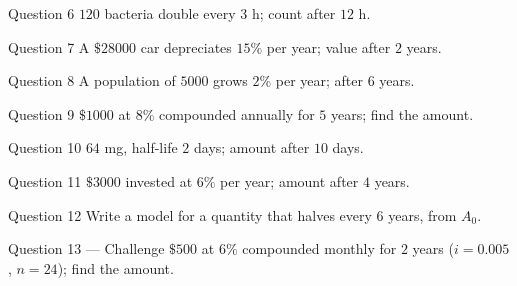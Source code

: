 \documentclass[11pt]{article}
\begin{document}
\begin{qbox}{Question 6}
$120$ bacteria double every $3$ h; count after $12$ h.\workspace{2.4cm}
\end{qbox}

\begin{qbox}{Question 7}
A $\$28000$ car depreciates $15\%$ per year; value after $2$ years.\workspace{3cm}
\end{qbox}

\begin{qbox}{Question 8}
A population of $5000$ grows $2\%$ per year; after $6$ years.\workspace{3cm}
\end{qbox}

\begin{qbox}{Question 9}
$\$1000$ at $8\%$ compounded annually for $5$ years; find the amount.\workspace{3cm}
\end{qbox}

\begin{qbox}{Question 10}
$64$ mg, half-life $2$ days; amount after $10$ days.\workspace{2.4cm}
\end{qbox}

\begin{qbox}{Question 11}
$\$3000$ invested at $6\%$ per year; amount after $4$ years.\workspace{3cm}
\end{qbox}

\begin{qbox}{Question 12}
Write a model for a quantity that halves every $6$ years, from $A_0$.\workspace{2.4cm}
\end{qbox}

\begin{qbox}{Question 13 --- Challenge}
$\$500$ at $6\%$ compounded monthly for $2$ years ($i=0.005$, $n=24$); find the amount.\workspace{3.5cm}
\end{qbox}

\clearpage
{}
\end{document}
